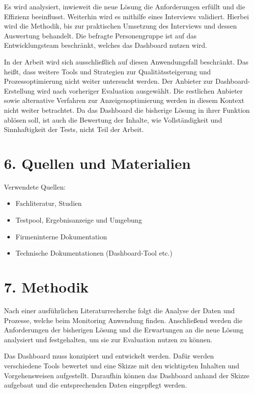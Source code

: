 Es wird analysiert, inwieweit die neue Lösung die Anforderungen erfüllt und die Effizienz beeinflusst. Weiterhin wird es mithilfe eines Interviews validiert. Hierbei wird die Methodik, bis zur praktischen Umsetzung des Interviews und dessen Auswertung behandelt. Die befragte Personengruppe ist auf das Entwicklungsteam beschränkt, welches das Dashboard nutzen wird.

In der Arbeit wird sich ausschließlich auf diesen Anwendungsfall beschränkt. Das heißt, dass weitere Tools und Strategien zur Qualitätssteigerung und Prozessoptimierung nicht weiter untersucht werden. Der Anbieter zur Dashboard-Erstellung wird nach vorheriger Evaluation ausgewählt. Die restlichen Anbieter sowie alternative Verfahren zur Anzeigenoptimierung werden in diesem Kontext nicht weiter betrachtet. Da das Dashboard die bisherige Lösung in ihrer Funktion ablösen soll, ist auch die Bewertung der Inhalte, wie Vollständigkeit und Sinnhaftigkeit der Tests, nicht Teil der Arbeit.

\section*{6. Quellen und Materialien}
Verwendete Quellen:
\begin{itemize}
    \item Fachliteratur, Studien
    \item Testpool, Ergebnisanzeige und Umgebung
    \item Firmeninterne Dokumentation
    \item Technische Dokumentationen (Dashboard-Tool etc.)
\end{itemize}

\section*{7. Methodik}
Nach einer ausführlichen Literaturrecherche folgt die Analyse der Daten und Prozesse, welche beim Monitoring Anwendung finden. Anschließend werden die Anforderungen der bisherigen Lösung und die Erwartungen an die neue Lösung analysiert und festgehalten, um sie zur Evaluation nutzen zu können.

Das Dashboard muss konzipiert und entwickelt werden. Dafür werden verschiedene Tools bewertet und eine Skizze mit den wichtigsten Inhalten und Vorgehensweisen aufgestellt. Daraufhin können das Dashboard anhand der Skizze aufgebaut und die entsprechenden Daten eingepflegt werden.

